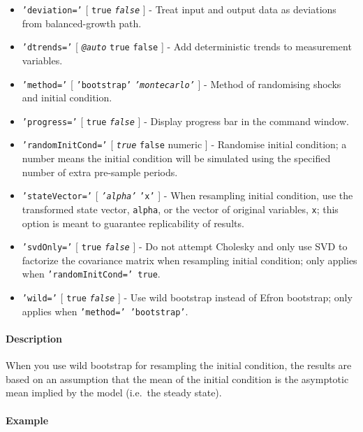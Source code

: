 \begin{itemize}
\item
  \texttt{'deviation='} {[} \texttt{true} \textbar{}
  \emph{\texttt{false}} {]} - Treat input and output data as deviations
  from balanced-growth path.
\item
  \texttt{'dtrends='} {[} \emph{\texttt{@auto}} \textbar{} \texttt{true}
  \textbar{} \texttt{false} {]} - Add deterministic trends to
  measurement variables.
\item
  \texttt{'method='} {[} \texttt{'bootstrap'} \textbar{}
  \emph{\texttt{'montecarlo'}} {]} - Method of randomising shocks and
  initial condition.
\item
  \texttt{'progress='} {[} \texttt{true} \textbar{}
  \emph{\texttt{false}} {]} - Display progress bar in the command
  window.
\item
  \texttt{'randomInitCond='} {[} \emph{\texttt{true}} \textbar{}
  \texttt{false} \textbar{} numeric {]} - Randomise initial condition; a
  number means the initial condition will be simulated using the
  specified number of extra pre-sample periods.
\item
  \texttt{'stateVector='} {[} \emph{\texttt{'alpha'}} \textbar{}
  \texttt{'x'} {]} - When resampling initial condition, use the
  transformed state vector, \texttt{alpha}, or the vector of original
  variables, \texttt{x}; this option is meant to guarantee replicability
  of results.
\item
  \texttt{'svdOnly='} {[} \texttt{true} \textbar{} \emph{\texttt{false}}
  {]} - Do not attempt Cholesky and only use SVD to factorize the
  covariance matrix when resampling initial condition; only applies when
  \texttt{'randomInitCond=' true}.
\item
  \texttt{'wild='} {[} \texttt{true} \textbar{} \emph{\texttt{false}}
  {]} - Use wild bootstrap instead of Efron bootstrap; only applies when
  \texttt{'method=' 'bootstrap'}.
\end{itemize}

\paragraph{Description}\label{description}

When you use wild bootstrap for resampling the initial condition, the
results are based on an assumption that the mean of the initial
condition is the asymptotic mean implied by the model (i.e.~the steady
state).

\paragraph{Example}\label{example}


